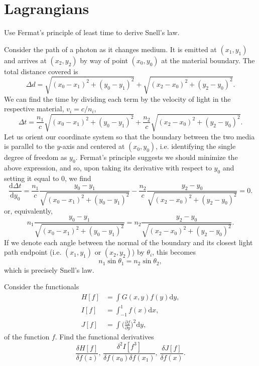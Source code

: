 \documentclass[../qft-for-the-gifted-amateur.tex]{subfiles}
\begin{document}
\section{Lagrangians}

\begin{questions}
	\printanswers

	\question Use Fermat's principle of least time to derive Snell's law.
	
	\begin{solution}
		Consider the path of a photon as it changes medium. It is emitted at $(x_{1}, y_{1})$ and arrives at $(x_2, y_2)$ by way of point $(x_0, y_0)$ at the material boundary. The total distance covered is
		\[
			\Delta{d} = \sqrt{(x_{0} - x_{1})^2 + (y_{0} - y_{1})^2} + \sqrt{(x_{2} - x_{0})^2 + (y_{2} - y_{0})^2}.
		\]
		We can find the time by dividing each term by the velocity of light in the respective material, $v_i = c/n_i$,
		\[
			\Delta{t} = \frac{n_1}{c}\sqrt{(x_{0} - x_{1})^2 + (y_{0} - y_{1})^2} + \frac{n_2}{c}\sqrt{(x_{2} - x_{0})^2 + (y_{2} - y_{0})^2}.
		\]
		Let us orient our coordinate system so that the boundary between the two media is parallel to the $y$-axis and centered at $(x_0, y_0)$, i.e. identifying the single degree of freedom as $y_0$. Fermat's principle suggests we should minimize the above expression, and so, upon taking its derivative with respect to $y_0$ and setting it equal to $0$, we find
		\[
			\frac{\mathrm{d}\Delta{t}}{\mathrm{d}y_0} = \frac{n_1}{c}\frac{y_0 - y_1}{\sqrt{(x_{0} - x_{1})^2 + (y_{0} - y_{1})^2}} - \frac{n_2}{c}\frac{y_2-y_0}{\sqrt{(x_{2} - x_{0})^2 + (y_{2} - y_{0})^2}} = 0.
		\]
		or, equivalently,
		\[
			n_1\frac{y_0 - y_1}{\sqrt{(x_{0} - x_{1})^2 + (y_{0} - y_{1})^2}} = n_2\frac{y_2-y_0}{\sqrt{(x_{2} - x_{0})^2 + (y_{2} - y_{0})^2}}.
		\]
		If we denote each angle between the normal of the boundary and its closest light path endpoint (i.e. $(x_1, y_1)$ or $(x_2, y_2)$) by $\theta_i$, this becomes
		\[
			n_1\sin\theta_1 = n_2\sin\theta_2,
		\]
		which is precisely Snell's law.
	\end{solution}
	
	\question Consider the functionals
	\begin{align*}
		H[f] &= \int G(x,y)f(y)\mathrm{d}y, \\
		I[f] &= \int_{-1}^{1}f(x)\mathrm{d}x, \\
		J[f] &= \int \Big(\frac{\partial{f}}{\partial{y}}\Big)^2\mathrm{d}y,
	\end{align*}
	of the function $f$. Find the functional derivatives
	\[
		\frac{\delta{H}[f]}{\delta{f}(z)}, \, \frac{\delta^2{I}[f^3]}{\delta{f}(x_0)\delta{f}(x_1)}, \, \frac{\delta{J}[f]}{\delta{f(x)}}.
	\]
	

\end{questions}
\end{document}
